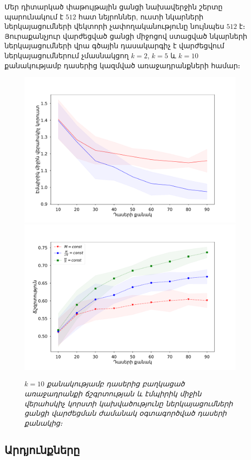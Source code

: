 \documentclass[12pt]{article}
\begin{document}
Մեր դիտարկած փաթույթային ցանցի նախավերջին շերտը պարունակում է $512$ հատ նեյրոններ, ուստի նկարների ներկայացումների վեկտորի չափողականությունը նույնպես $512$ է։ Յուրաքանչյուր վարժեցված  ցանցի միջոցով ստացված նկարների ներկայացումների  վրա գծային դասակարգիչ է վարժեցվում ներկայացումներում չմասնակցող $k=2$, $k=5$ և $k=10$ քանակությամբ դասերից կազմված  առաջադրանքների համար։



\begin{figure}[htp]

\centering
\includegraphics[width=.5\textwidth]{imgs/k=10.pdf}\hfill
\includegraphics[width=.5\textwidth]{imgs/k=10_acc.pdf}\hfill
\caption{\textit{$k=10$ քանակությամբ դասերից բաղկացած առաջադրանքի ճշգրտության և էմպիրիկ միջին վերահսկիչ կորստի կախվածությունը ներկայացումների ցանցի վարժեցման ժամանակ  օգտագործված դասերի քանակից։}}
\label{fig:figure3}

\end{figure}



{}


\subsection*{\hfill Արդյունքները \hfill} \noindent
\end{document}
